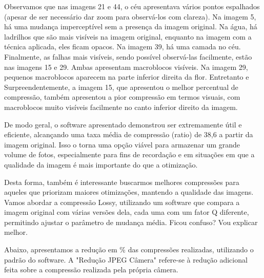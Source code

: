 Observamos que nas imagens 21 e 44, o céu apresentava vários pontos espalhados (apesar de ser necessário dar zoom para observá-los com clareza).
Na imagem 5, há uma mudança imperceptível sem a presença da imagem original. Na água, há ladrilhos que são mais visíveis na imagem original, enquanto na imagem com a técnica aplicada, eles ficam opacos.
Na imagem 39, há uma camada no céu.
Finalmente, as falhas mais visíveis, sendo possível observá-las facilmente, estão nas imagens 15 e 29. Ambas apresentam macroblocos visíveis. Na imagem 29, pequenos macroblocos aparecem na parte inferior direita da flor. Entretanto e Surpreendentemente, a imagem 15, que apresentou o melhor percentual de compressão, também apresentou a pior compressão em termos visuais, com macroblocos muito visíveis facilmente no canto inferior direito da imagem.

\paragrafo De modo geral, o software apresentado demonstrou ser extremamente útil e eficiente, alcançando uma taxa média de compressão (ratio) de 38,6 a partir da imagem original. Isso o torna uma opção viável para armazenar um grande volume de fotos, especialmente para fins de recordação e em situações em que a qualidade da imagem é mais importante do que a otimização.

\paragrafo Desta forma, também é interessante buscarmos melhores compressões para aqueles que priorizam maiores otimizações, mantendo a qualidade das imagens. Vamos abordar a compressão Lossy, utilizando um software que compara a imagem original com várias versões dela, cada uma com um fator Q diferente, permitindo ajustar o parâmetro de mudança média. Ficou confuso? Vou explicar melhor.

\paragrafo Abaixo, apresentamos a redução em \% das compressões realizadas, utilizando o padrão do software. A "Redução JPEG Câmera" refere-se à redução adicional feita sobre a compressão realizada pela própria câmera.

